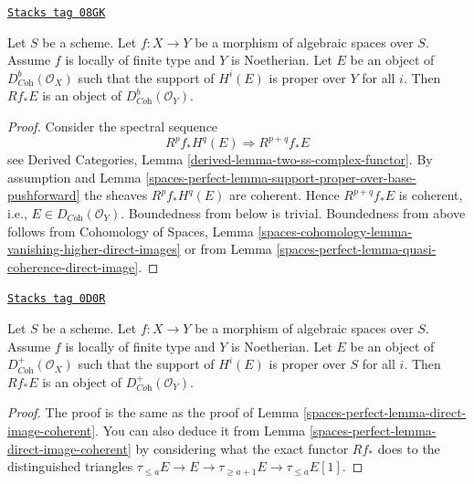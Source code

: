 \begin{lemma}
\label{spaces-perfect-lemma-direct-image-coherent}
\href{https://stacks.math.columbia.edu/tag/08GK}{\texttt{Stacks tag 08GK}}

Let $S$ be a scheme. Let $f : X \to Y$ be a morphism of algebraic spaces
over $S$. Assume $f$ is locally of finite type and $Y$ is Noetherian.
Let $E$ be an object of $D^b_{\textit{Coh}}(\mathcal{O}_X)$ such that the
support of $H^i(E)$ is proper over $Y$ for all $i$.
Then $Rf_*E$ is an object of $D^b_{\textit{Coh}}(\mathcal{O}_Y)$.
\end{lemma}

\begin{proof}
Consider the spectral sequence
$$
R^pf_*H^q(E) \Rightarrow R^{p + q}f_*E
$$
see Derived Categories, Lemma \ref{derived-lemma-two-ss-complex-functor}.
By assumption and Lemma \ref{spaces-perfect-lemma-support-proper-over-base-pushforward}
the sheaves $R^pf_*H^q(E)$ are coherent. Hence
$R^{p + q}f_*E$ is coherent, i.e., $E \in D_{\textit{Coh}}(\mathcal{O}_Y)$.
Boundedness from below is trivial. Boundedness from above
follows from
Cohomology of Spaces, Lemma
\ref{spaces-cohomology-lemma-vanishing-higher-direct-images}
or from
Lemma \ref{spaces-perfect-lemma-quasi-coherence-direct-image}.
\end{proof}

\begin{lemma}
\label{spaces-perfect-lemma-direct-image-coherent-bdd-below}
\href{https://stacks.math.columbia.edu/tag/0D0R}{\texttt{Stacks tag 0D0R}}

Let $S$ be a scheme. Let $f : X \to Y$ be a morphism of algebraic spaces
over $S$. Assume $f$ is locally of finite type and $Y$ is Noetherian.
Let $E$ be an object of
$D^+_{\textit{Coh}}(\mathcal{O}_X)$ such that the support of $H^i(E)$
is proper over $S$ for all $i$.
Then $Rf_*E$ is an object of $D^+_{\textit{Coh}}(\mathcal{O}_Y)$.
\end{lemma}

\begin{proof}
The proof is the same as the proof of
Lemma \ref{spaces-perfect-lemma-direct-image-coherent}.
You can also deduce it from
Lemma \ref{spaces-perfect-lemma-direct-image-coherent}
by considering what the exact functor $Rf_*$ does to
the distinguished triangles
$\tau_{\leq a}E \to E \to \tau_{\geq a + 1}E \to \tau_{\leq a}E[1]$.
\end{proof}

